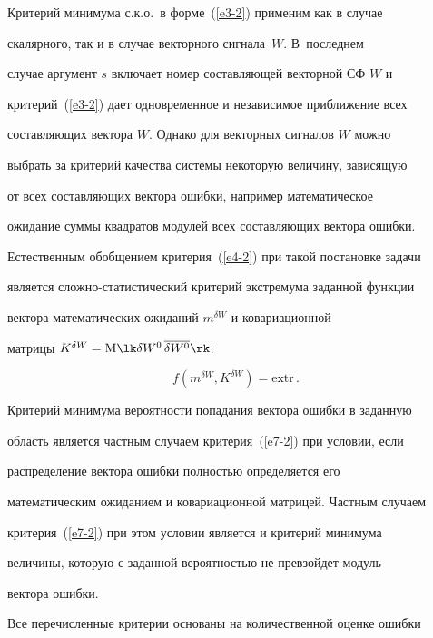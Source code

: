 Критерий минимума с.к.о.\ в форме~(\ref{e3-2}) применим как в случае


скалярного, так и в случае векторного сигнала~$W$. В~последнем


случае аргумент  $s$ включает номер составляющей векторной СФ $W$ и


критерий~(\ref{e3-2}) дает одновременное и независимое приближение всех


составляющих вектора $W$. Однако для векторных сигналов $W$ можно


выбрать за критерий качества системы некоторую величину, зависящую


от всех составляющих вектора ошибки, например математическое


ожидание суммы квадратов модулей всех составляющих вектора ошибки.


Естественным обобщением критерия~(\ref{e4-2}) при такой постановке задачи


является сложно-статистический критерий экстремума заданной функции


вектора математических ожиданий  $m^{\delta W}$ и ковариационной


матрицы $K^{\delta W} =\mathrm{M} \lk \delta W^0\,\overline{\delta


W^0}\rk$:


\begin{equation}


f( m^{\delta W}, K^{\delta W}) =\mathrm{extr}\,.\label{e7-2}


\end{equation}





Критерий минимума вероятности попадания вектора ошибки в заданную


область является частным случаем критерия~(\ref{e7-2}) при условии, если


распределение вектора ошибки полностью определяется его


математическим ожиданием и ковариационной матрицей. Частным  случаем


критерия~(\ref{e7-2}) при этом условии является и  критерий минимума


величины, которую с заданной вероятностью не превзойдет модуль


вектора ошибки.





Все перечисленные критерии основаны на количественной оценке ошибки


